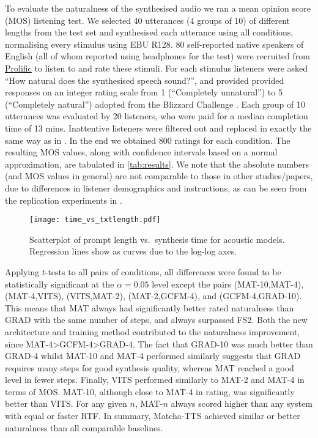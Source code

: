 \documentclass[british]{article}
\begin{document}
To evaluate the naturalness of the synthesised audio we ran a mean opinion score (MOS)
listening test.
We selected 40 utterances (4 groups of 10) of different lengths from the test set and synthesised each utterance using all conditions, normalising every stimulus
using EBU R128.
80 self-reported native speakers of English (all of whom reported using headphones for the test) were recruited from \href{https://prolific.co/}{Prolific} to listen to and rate these stimuli.
For each stimulus listeners were asked ``How natural does the synthesised speech sound?'', and provided provided responses on an integer rating scale from 1 (``Completely unnatural'') to 5 (``Completely natural'') adopted from the Blizzard Challenge \cite{prahallad2013blizzard}.
Each group of 10 utterances was evaluated by 20 listeners, who were paid  for a median completion time of 13 mins.
Inattentive listeners were filtered out and replaced in exactly the same way as in \cite{mehta2023overflow}.
In the end we obtained 800 ratings for each condition.
The resulting MOS values, along with confidence intervals based on a normal approximation, are tabulated in \cref{tab:results}.
We note that the absolute numbers (and MOS values in general) are not comparable to those in other studies/papers, due to differences in listener demographics and instructions, as can be seen from the replication experiments in \cite{chiang23why, kirkland2023stuck}.\begin{figure}[!t]
\centering
\texttt{[image: time\_vs\_txtlength.pdf]}
\caption{Scatterplot of prompt length vs.\ synthesis time for acoustic models. Regression lines show as curves due to the log-log axes.}
\label{fig: rtf slopes}
\vspace{-\baselineskip}
\end{figure}

Applying $t$-tests to all pairs of conditions, all differences were found to be statistically significant at the $\alpha=0.05$ level except the pairs (MAT-10,MAT-4), (MAT-4,VITS), (VITS,MAT-2), (MAT-2,GCFM-4), and (GCFM-4,GRAD-10).
This means that MAT always had significantly better rated naturalness than GRAD with the same number of steps, and always surpassed FS2.
Both the new architecture and training method contributed to the naturalness improvement, since MAT-4>GCFM-4>GRAD-4.
The fact that GRAD-10 was much better than GRAD-4 whilst MAT-10 and MAT-4 performed similarly suggests that GRAD requires many steps for good synthesis quality, whereas MAT reached a good level in fewer steps.
Finally, VITS performed similarly to MAT-2 and MAT-4 in terms of MOS.
MAT-10, although close to MAT-4 in rating, was significantly better than VITS.
For any given $n$, MAT-$n$ always scored higher than any system with equal or faster RTF.
In summary, Matcha-TTS achieved similar or better naturalness than all comparable baselines.
\end{document}
